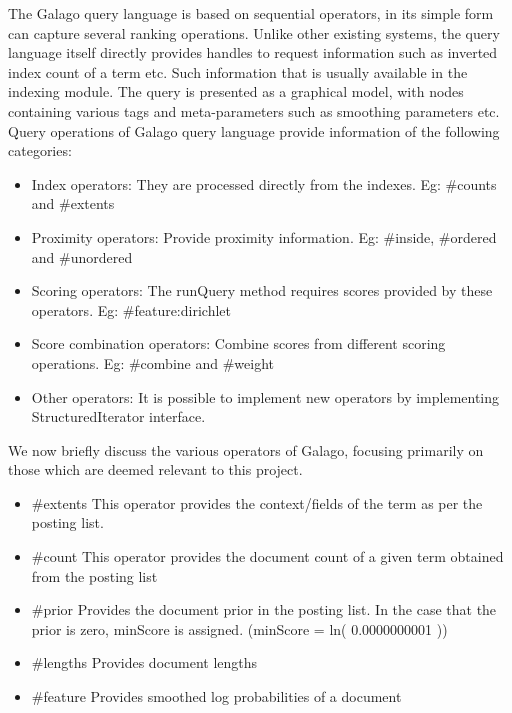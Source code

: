 \documentclass[draftcls, onecolumn, 11pt]{IEEEtran}
\begin{document}
The Galago query language is based on sequential operators, in its simple form can capture several ranking operations. Unlike other existing systems, the query language itself directly provides handles to request information such as inverted index count of a term etc. Such information that is usually available in the indexing module. The query is presented as a graphical model, with nodes containing various tags and meta-parameters such as smoothing parameters etc.
Query operations of Galago query language provide information of the following categories:

\begin{itemize}
\item{Index operators:}
They are processed directly from the indexes.
 Eg:  \#counts and \#extents

\item{Proximity operators:}
Provide proximity information.
Eg:  \#inside, \#ordered and \#unordered

\item{Scoring operators:}
The runQuery method requires scores provided by these operators.
Eg: \#feature:dirichlet

\item{Score combination operators:}
Combine scores from different scoring operations.
Eg: \#combine and \#weight

\item{Other operators:}
It is possible to implement new operators by implementing StructuredIterator interface.
\end{itemize}

We now briefly discuss the various operators of Galago, focusing primarily on those which are deemed relevant to this project.
\begin{itemize}
\item {\#extents}
This operator provides the context/fields of the term as per the posting list.

\item {\#count}
 This operator provides the document count of a given term obtained from the posting list

\item {\#prior}
Provides the document prior in the posting list. In the case that the prior is zero, minScore is assigned. (minScore = ln( 0.0000000001 ))

\item {\#lengths}
Provides document lengths

\item{\#feature}
Provides smoothed log probabilities of a document
\end{itemize}
\end{document}
